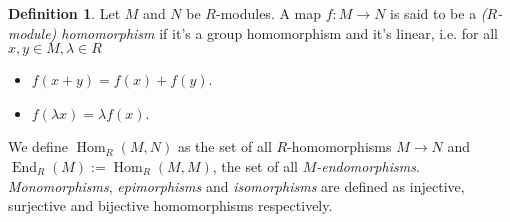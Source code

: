 \documentclass[12pt,a4paper]{report}
\theoremstyle{definition}
\newtheorem{defn}[theorem]{Definition}
\theoremstyle{num.custom-title}
\DeclareMathOperator{\Hom}{Hom}
\DeclareMathOperator{\End}{End}
\begin{document}
\begin{defn}
Let $M$ and $N$ be $R$-modules. A map $f : M \to N$ is said to be a \emph{($R$-module) homomorphism} if it's a group homomorphism and it's linear, i.e. for all $x,y \in M, \lambda \in R$
\begin{itemize}
\item $f(x+y)=f(x)+f(y)$.
\item $f(\lambda x) = \lambda f(x)$.
\end{itemize}
We define $\Hom_R(M,N)$ as the set of all $R$-homomorphisms $M \to N$ and $\End_R(M) := \Hom_R(M,M)$, the set of all \emph{$M$-endomorphisms}. \emph{Monomorphisms}, \emph{epimorphisms} and \emph{isomorphisms} are defined as injective, surjective and bijective homomorphisms respectively.
\end{defn}
\end{document}
